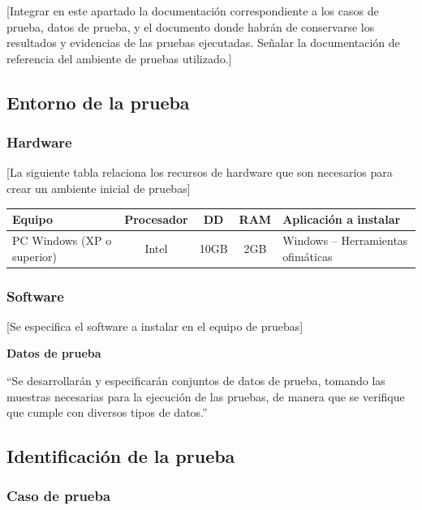 \documentclass[12pt,letterpaper]{article}
\begin{document}
[Integrar en este apartado la documentación correspondiente a los casos de prueba, datos de prueba, y el documento donde habrán de conservarse los resultados y evidencias de las pruebas ejecutadas. Señalar la documentación de referencia del ambiente de pruebas utilizado.]

\subsection{Entorno de la prueba}

\subsubsection{Hardware}

[La siguiente tabla relaciona los recursos de hardware que son necesarios para crear un ambiente inicial de pruebas]

\begin{center}
\begin{tabularx}{\textwidth}{|l|c|c|c|X|}
  \hline
  \textbf{Equipo} & \textbf{Procesador} & \textbf{DD} & \textbf{RAM} & \textbf{Aplicación a instalar} \\
  \hline
  PC Windows (XP o superior) & Intel & 10GB & 2GB & Windows -- Herramientas ofimáticas \\
  \hline
\end{tabularx}
\end{center}

\subsubsection{Software}

[Se especifica el software a instalar en el equipo de pruebas]

\textbf{Datos de prueba}

``Se desarrollarán y especificarán conjuntos de datos de prueba, tomando las muestras necesarias para la ejecución de las pruebas, de manera que se verifique que cumple con diversos tipos de datos.''

\subsection{Identificación de la prueba}

\subsubsection{Caso de prueba}
\end{document}

